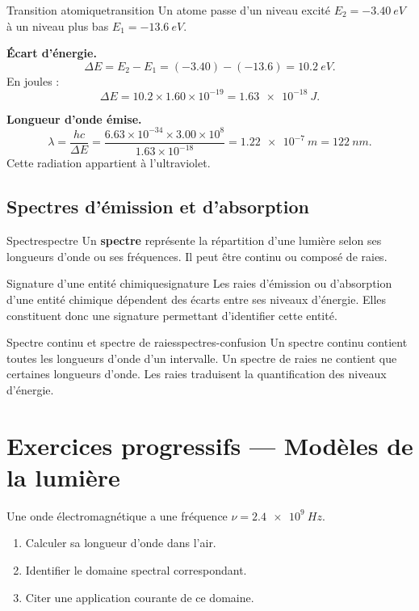 \documentclass[11pt,a4paper]{article}
\newcounter{exercice}
\newenvironment{exercice}[1][]{%
  \refstepcounter{exercice}%
  \begin{tcolorbox}[colframe=bleuprepa,colback=white,title={Exercice \theexercice\; #1}]%
}{\end{tcolorbox}}
\begin{document}
\begin{examplebox}{Transition atomique}{transition}
Un atome passe d'un niveau excité $E_2=-\SI{3.40}{eV}$ à un niveau plus bas $E_1=-\SI{13.6}{eV}$.

\textbf{Écart d'énergie.}
\[
\Delta E=E_2-E_1=(-3.40)-(-13.6)=\SI{10.2}{eV}.
\]
En joules :
\[
\Delta E=10.2\times 1.60\times 10^{-19}=\SI{1.63e-18}{J}.
\]

\textbf{Longueur d'onde émise.}
\[
\lambda=\frac{hc}{\Delta E}=\frac{6.63\times 10^{-34}\times 3.00\times 10^8}{1.63\times 10^{-18}}=\SI{1.22e-7}{m}=\SI{122}{nm}.
\]
Cette radiation appartient à l'ultraviolet.
\end{examplebox}

\subsection{Spectres d'émission et d'absorption}

\begin{definitionbox}{Spectre}{spectre}
Un \textbf{spectre} représente la répartition d'une lumière selon ses longueurs d'onde ou ses fréquences. Il peut être continu ou composé de raies.
\end{definitionbox}

\begin{propositionbox}{Signature d'une entité chimique}{signature}
Les raies d'émission ou d'absorption d'une entité chimique dépendent des écarts entre ses niveaux d'énergie. Elles constituent donc une signature permettant d'identifier cette entité.
\end{propositionbox}

\begin{warningbox}{Spectre continu et spectre de raies}{spectres-confusion}
Un spectre continu contient toutes les longueurs d'onde d'un intervalle. Un spectre de raies ne contient que certaines longueurs d'onde. Les raies traduisent la quantification des niveaux d'énergie.
\end{warningbox}

\section{Exercices progressifs — Modèles de la lumière}

\begin{exercice}[Domaine spectral]
Une onde électromagnétique a une fréquence $\nu=\SI{2.4e9}{Hz}$.
\begin{enumerate}[label=\alph*)]
  \item Calculer sa longueur d'onde dans l'air.
  \item Identifier le domaine spectral correspondant.
  \item Citer une application courante de ce domaine.
\end{enumerate}
\end{exercice}
\end{document}
